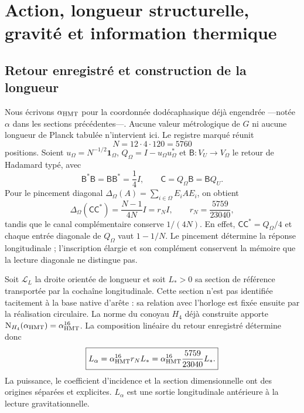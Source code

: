\section{Action, longueur structurelle, gravité et information thermique}
\label{v:ant:sec:gravity}

\subsection{Retour enregistré et construction de la longueur}

Nous écrivons $\alpha_{\mathrm{HMT}}$ pour la coordonnée dodécaphasique déjà engendrée
---notée $\alpha$ dans les sections précédentes---. Aucune valeur
métrologique de $G$ ni aucune longueur de Planck tabulée n’intervient ici. Le
registre marqué réunit
\begin{equation}
 N=12\cdot4\cdot120=5760
 \label{v:eq:cardinal-longitud-alpha}
\end{equation}
positions. Soient $u_\Omega=N^{-1/2}\mathbf1_\Omega$,
$Q_\Omega=I-u_\Omega u_\Omega^*$ et
$\mathsf B:V_U\to V_\Omega$ le retour de Hadamard typé, avec
\begin{equation}
 \mathsf B^*\mathsf B=\mathsf B\mathsf B^*=\frac14I,
 \qquad \mathsf C=Q_\Omega\mathsf B=\mathsf BQ_U.
 \label{v:eq:retorno-hadamard-longitud}
\end{equation}
Pour le pincement diagonal
$\Delta_\Omega(A)=\sum_{i\in\Omega}E_iAE_i$, on obtient
\begin{equation}
 \Delta_\Omega(\mathsf C\mathsf C^*)
 =\frac{N-1}{4N}I=r_NI,
 \qquad
 r_N=\frac{5759}{23040},
 \label{v:eq:residuo-longitud-alpha}
\end{equation}
tandis que le canal complémentaire conserve $1/(4N)$. En effet,
$\mathsf C\mathsf C^*=Q_\Omega/4$ et chaque entrée diagonale de
$Q_\Omega$ vaut $1-1/N$. Le pincement détermine la réponse
longitudinale ; l’inscription élargie et son complément conservent la
mémoire que la lecture diagonale ne distingue pas.

Soit $\mathcal L_L$ la droite orientée de longueur et soit $L_*>0$ sa
section de référence transportée par la cochaîne longitudinale. Cette
section n’est pas identifiée tacitement à la base native d’arête :
sa relation avec l’horloge est fixée ensuite par la réalisation circulaire.
La norme du conoyau $H_4$ déjà construite apporte
$\mathrm N_{H_4}(\alpha_{\mathrm{HMT}})=\alpha_{\mathrm{HMT}}^{16}$. La composition
linéaire du retour enregistré détermine donc
\begin{equation}
 \boxed{
 L_\alpha=\alpha_{\mathrm{HMT}}^{16}r_NL_*
 =\alpha_{\mathrm{HMT}}^{16}\frac{5759}{23040}L_* .}
 \label{v:eq:longitud-alpha}
\end{equation}
La puissance, le coefficient d’incidence et la section dimensionnelle ont
des origines séparées et explicites. $L_\alpha$ est une sortie longitudinale
antérieure à la lecture gravitationnelle.


